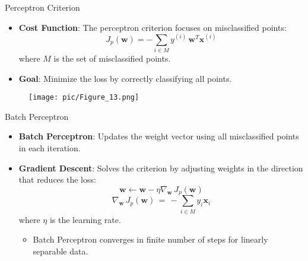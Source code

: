 \documentclass[serif, aspectratio=169]{beamer}
\begin{document}
\begin{frame}{Perceptron Criterion}
    \begin{itemize}\itemsep1.2em
        \item \textbf{Cost Function}:
        The perceptron criterion focuses on misclassified points:
        \[
        J_p(\mathbf{w}) = - \sum_{i \in M} y^{(i)} \, \mathbf{w}^T \mathbf{x}^{(i)}
        \]
        where \( M \) is the set of misclassified points.
        \item \textbf{Goal}:
        Minimize the loss by correctly classifying all points.
    \end{itemize}
    \begin{center}
        \begin{figure}[bh]
            \texttt{[image: pic/Figure\_13.png]}
        \end{figure}
    \endminipage
    \end{center}
\end{frame}


\begin{frame}{Batch Perceptron}
    \begin{itemize}\itemsep1.5em
        \item \justifying \textbf{Batch Perceptron}:
        Updates the weight vector using all misclassified points in each iteration.
        \item \justifying \textbf{Gradient Descent}:
        Solves the criterion by adjusting weights in the direction that reduces the loss:
        \[
        \mathbf{w} \leftarrow \mathbf{w} - \eta \nabla_\mathbf{w} \, J_p(\mathbf{w})
        \]
        \[
        \nabla_\mathbf{w} \, J_p(\mathbf{w}) \, = \, - \sum_{i \in M} y_i \mathbf{x}_i
        \]
        where \( \eta \) is the learning rate.
        \begin{itemize}
            \item Batch Perceptron converges in finite number of steps for linearly separable data.
        \end{itemize}
    \end{itemize}
\end{frame}
\end{document}

